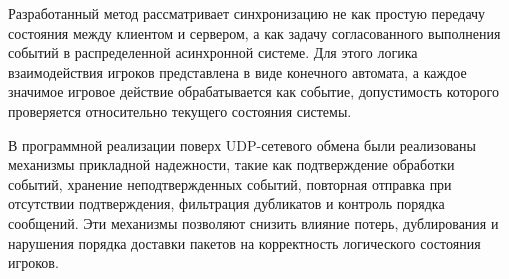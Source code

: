 Разработанный метод рассматривает синхронизацию не как простую передачу состояния между клиентом и сервером, 
а как задачу согласованного выполнения событий в распределенной асинхронной системе. Для этого логика взаимодействия игроков представлена в виде конечного автомата, 
а каждое значимое игровое действие обрабатывается как событие, допустимость которого проверяется относительно текущего состояния системы.

В программной реализации поверх UDP-сетевого обмена были реализованы механизмы прикладной надежности, такие как подтверждение обработки событий, 
хранение неподтвержденных событий, повторная отправка при отсутствии подтверждения, фильтрация дубликатов и контроль порядка сообщений. 
Эти механизмы позволяют снизить влияние потерь, дублирования и нарушения порядка доставки пакетов на корректность логического состояния игроков.
